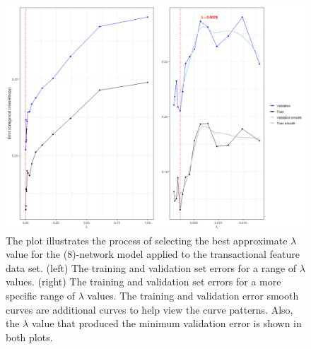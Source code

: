 \begin{figure}[]
	\begin{center}
		\includegraphics[scale = 0.5]{fig/CH3/trans_mod_1_lambda_plot.png}
		\caption{The plot illustrates the process of selecting the best approximate $\lambda$ value for the (8)-network model applied to the transactional feature data set. (left) The training and validation set errors for a range of $\lambda$ values. (right) The training and validation set errors for a more specific range of $\lambda$ values. The training and validation error smooth curves are additional curves to help view the curve patterns. Also, the $\lambda$ value that produced the minimum validation error is shown in both plots.}
		\label{fig:ch3_nn_validation_mod1_trans}
	\end{center}	
\end{figure}

